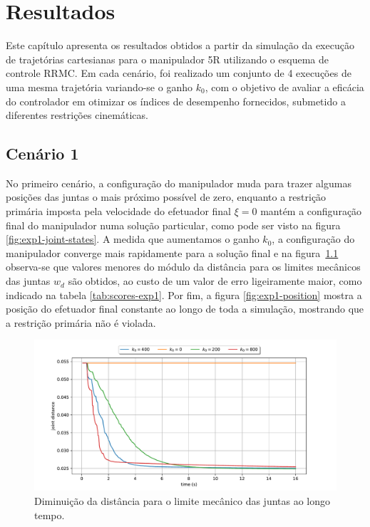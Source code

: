 \chapter{Resultados}\label{cap:results}

Este capítulo apresenta os resultados obtidos a partir da simulação da 
execução de trajetórias cartesianas para o manipulador 5R utilizando o esquema 
de controle RRMC. Em cada cenário, foi realizado um conjunto de 4 execuções de 
uma mesma trajetória variando-se o ganho \(k_0\), com o objetivo de avaliar 
a eficácia do controlador em otimizar os índices de desempenho fornecidos, submetido 
a diferentes restrições cinemáticas.

\section{Cenário 1}

No primeiro cenário, a configuração do manipulador muda para trazer algumas posições 
das juntas o mais próximo possível de zero, enquanto a restrição primária imposta pela velocidade 
do efetuador final \(\xi = 0\) mantém a configuração final do manipulador numa solução particular, 
como pode ser visto na figura \ref*{fig:exp1-joint-states}. A medida que aumentamos o ganho \(k_0\), a 
configuração do manipulador converge mais rapidamente para a solução final e na figura~\ref*{fig:exp1-metric}
observa-se que valores menores do módulo da distância para os limites mecânicos das juntas \(w_d\) são obtidos, ao custo 
de um valor de erro ligeiramente maior, como indicado na tabela \ref*{tab:scores-exp1}. Por fim, a figura 
\ref*{fig:exp1-position} mostra a posição do efetuador final constante ao longo de toda a simulação, 
mostrando que a restrição primária não é violada.

\begin{figure}
	\centering
	\includegraphics[width=\textwidth]{./Images/2024-06-11-09-23-42/metric_joint_distance.pdf}
	\caption{Diminuição da distância para o limite mecânico das juntas ao longo tempo.}\label{fig:exp1-metric}
\end{figure}

